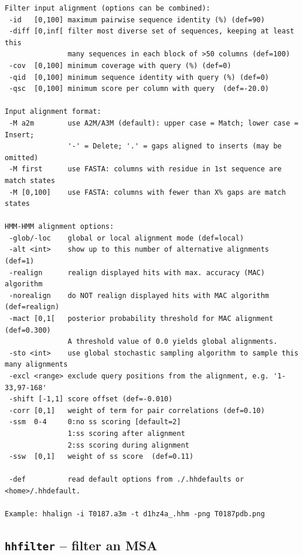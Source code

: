 \documentclass[11pt,a4paper]{article}
\begin{document}
\begin{verbatim}
Filter input alignment (options can be combined):                         
 -id   [0,100] maximum pairwise sequence identity (%) (def=90)   
 -diff [0,inf[ filter most diverse set of sequences, keeping at least this    
               many sequences in each block of >50 columns (def=100)
 -cov  [0,100] minimum coverage with query (%) (def=0) 
 -qid  [0,100] minimum sequence identity with query (%) (def=0) 
 -qsc  [0,100] minimum score per column with query  (def=-20.0)

Input alignment format:                                                     
 -M a2m        use A2M/A3M (default): upper case = Match; lower case = Insert;
               '-' = Delete; '.' = gaps aligned to inserts (may be omitted)   
 -M first      use FASTA: columns with residue in 1st sequence are match states
 -M [0,100]    use FASTA: columns with fewer than X% gaps are match states   

HMM-HMM alignment options:                                                  
 -glob/-loc    global or local alignment mode (def=local)         
 -alt <int>    show up to this number of alternative alignments (def=1)    
 -realign      realign displayed hits with max. accuracy (MAC) algorithm 
 -norealign    do NOT realign displayed hits with MAC algorithm (def=realign)
 -mact [0,1[   posterior probability threshold for MAC alignment (def=0.300) 
               A threshold value of 0.0 yields global alignments.
 -sto <int>    use global stochastic sampling algorithm to sample this many alignments
 -excl <range> exclude query positions from the alignment, e.g. '1-33,97-168'
 -shift [-1,1] score offset (def=-0.010)                                      
 -corr [0,1]   weight of term for pair correlations (def=0.10)               
 -ssm  0-4     0:no ss scoring [default=2]               
               1:ss scoring after alignment                                  
               2:ss scoring during alignment                                 
 -ssw  [0,1]   weight of ss score  (def=0.11)                               

 -def          read default options from ./.hhdefaults or <home>/.hhdefault. 

Example: hhalign -i T0187.a3m -t d1hz4a_.hhm -png T0187pdb.png 
\end{verbatim} \normalsize

\subsection{{\tt hhfilter} -- filter an MSA}
\end{document}
